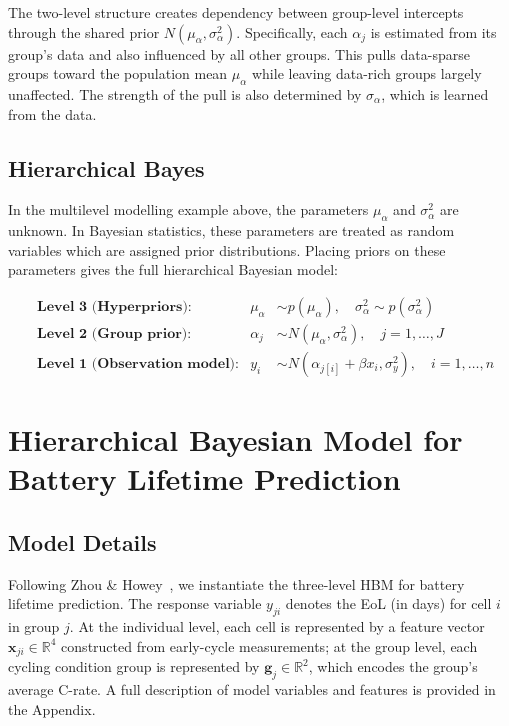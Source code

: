 The two-level structure creates dependency between group-level intercepts through the shared prior $N(\mu_\alpha, \sigma^2_\alpha)$. Specifically, each $\alpha_j$ is estimated from its group's data and also influenced by all other groups. This pulls data-sparse groups toward the population mean $\mu_\alpha$ while leaving data-rich groups largely unaffected. The strength of the pull is also determined by $\sigma_\alpha$, which is learned from the data.

\subsection{Hierarchical Bayes}
In the multilevel modelling example above, the parameters $\mu_\alpha$ and $\sigma^2_\alpha$ are unknown. In Bayesian statistics, these parameters are treated as random variables which are assigned prior distributions. 
Placing priors on these parameters gives the full hierarchical Bayesian model:

\begin{align*}
&\textbf{Level 3 (Hyperpriors):} & \mu_\alpha &\sim p(\mu_\alpha), \quad \sigma^2_\alpha \sim p(\sigma^2_\alpha) \\[6pt]
&\textbf{Level 2 (Group prior):} & \alpha_j &\sim N(\mu_\alpha, \sigma^2_\alpha), \quad j = 1, \dots, J \\[6pt]
&\textbf{Level 1 (Observation model):} & y_i &\sim N(\alpha_{j[i]} + \beta x_i, \sigma^2_y), \quad i = 1, \dots, n
\end{align*}

\section{Hierarchical Bayesian Model for Battery Lifetime Prediction}
\subsection{Model Details}
Following Zhou \& Howey~\cite{ZHOU20236117}, we instantiate the three-level HBM for battery lifetime prediction. The response variable $y_{ji}$ denotes the EoL (in days) for cell $i$ in group $j$. 
At the individual level, each cell is represented by a feature vector $\mathbf{x}_{ji} \in \mathbb{R}^4$ constructed from early-cycle measurements; at the group level, each cycling condition 
group is represented by $\mathbf{g}_j \in \mathbb{R}^2$, which encodes the group's average C-rate. A full description of model variables and features is provided in the Appendix.

